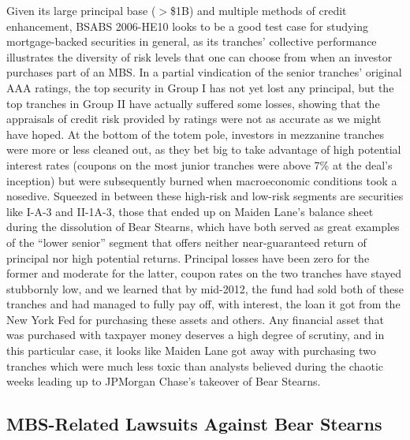 \documentclass[12pt]{article}
\begin{document}
Given its large principal base ($>$\$1B) and multiple methods of credit enhancement, BSABS 2006-HE10 looks to be a good test case for studying mortgage-backed securities in general, as its tranches’ collective performance illustrates the diversity of risk levels that one can choose from when an investor purchases part of an MBS. In a partial vindication of the senior tranches’ original AAA ratings, the top security in Group I has not yet lost any principal, but the top tranches in Group II have actually suffered some losses, showing that the appraisals of credit risk provided by ratings were not as accurate as we might have hoped. At the bottom of the totem pole, investors in mezzanine tranches were more or less cleaned out, as they bet big to take advantage of high potential interest rates (coupons on the most junior tranches were above 7\% at the deal’s inception) but were subsequently burned when macroeconomic conditions took a nosedive. Squeezed in between these high-risk and low-risk segments are securities like I-A-3 and II-1A-3, those that ended up on Maiden Lane’s balance sheet during the dissolution of Bear Stearns, which have both served as great examples of the “lower senior” segment that offers neither near-guaranteed return of principal nor high potential returns. Principal losses have been zero for the former and moderate for the latter, coupon rates on the two tranches have stayed stubbornly low, and we learned that by mid-2012, the fund had sold both of these tranches and had managed to fully pay off, with interest, the loan it got from the New York Fed for purchasing these assets and others. Any financial asset that was purchased with taxpayer money deserves a high degree of scrutiny, and in this particular case, it looks like Maiden Lane got away with purchasing two tranches which were much less toxic than analysts believed during the chaotic weeks leading up to JPMorgan Chase’s takeover of Bear Stearns.


\subsection*{MBS-Related Lawsuits Against Bear Stearns}
\end{document}
